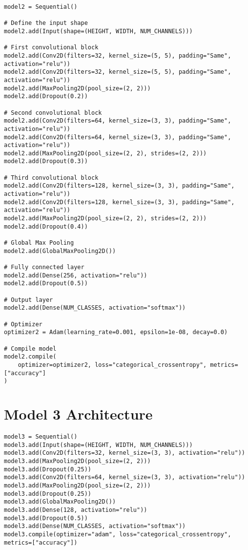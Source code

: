 \begin{verbatim}
model2 = Sequential()

# Define the input shape
model2.add(Input(shape=(HEIGHT, WIDTH, NUM_CHANNELS)))

# First convolutional block
model2.add(Conv2D(filters=32, kernel_size=(5, 5), padding="Same", activation="relu"))
model2.add(Conv2D(filters=32, kernel_size=(5, 5), padding="Same", activation="relu"))
model2.add(MaxPooling2D(pool_size=(2, 2)))
model2.add(Dropout(0.2))

# Second convolutional block
model2.add(Conv2D(filters=64, kernel_size=(3, 3), padding="Same", activation="relu"))
model2.add(Conv2D(filters=64, kernel_size=(3, 3), padding="Same", activation="relu"))
model2.add(MaxPooling2D(pool_size=(2, 2), strides=(2, 2)))
model2.add(Dropout(0.3))

# Third convolutional block
model2.add(Conv2D(filters=128, kernel_size=(3, 3), padding="Same", activation="relu"))
model2.add(Conv2D(filters=128, kernel_size=(3, 3), padding="Same", activation="relu"))
model2.add(MaxPooling2D(pool_size=(2, 2), strides=(2, 2)))
model2.add(Dropout(0.4))

# Global Max Pooling
model2.add(GlobalMaxPooling2D())

# Fully connected layer
model2.add(Dense(256, activation="relu"))
model2.add(Dropout(0.5))

# Output layer
model2.add(Dense(NUM_CLASSES, activation="softmax"))

# Optimizer
optimizer2 = Adam(learning_rate=0.001, epsilon=1e-08, decay=0.0)

# Compile model
model2.compile(
    optimizer=optimizer2, loss="categorical_crossentropy", metrics=["accuracy"]
)
\end{verbatim}

\section{Model 3 Architecture}
\label{app:app-A section4}
\begin{verbatim}
model3 = Sequential()
model3.add(Input(shape=(HEIGHT, WIDTH, NUM_CHANNELS)))
model3.add(Conv2D(filters=32, kernel_size=(3, 3), activation="relu"))
model3.add(MaxPooling2D(pool_size=(2, 2)))
model3.add(Dropout(0.25))
model3.add(Conv2D(filters=64, kernel_size=(3, 3), activation="relu"))
model3.add(MaxPooling2D(pool_size=(2, 2)))
model3.add(Dropout(0.25))
model3.add(GlobalMaxPooling2D())
model3.add(Dense(128, activation="relu"))
model3.add(Dropout(0.5))
model3.add(Dense(NUM_CLASSES, activation="softmax"))
model3.compile(optimizer="adam", loss="categorical_crossentropy", metrics=["accuracy"])
\end{verbatim}

